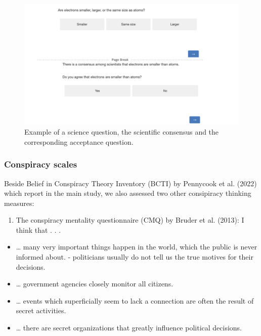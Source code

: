 \documentclass[
  doc,floatsintext]{apa6}
\providecommand{\tightlist}{%
  \setlength{\itemsep}{0pt}\setlength{\parskip}{0pt}}
\begin{document}
\begin{figure}

\includegraphics[width=1\linewidth]{./figures/study1_question_example} \hfill{}

\caption{Example of a science question, the scientific consensus and the corresponding acceptance question.}\label{fig:stimulus-example}
\end{figure}

\subsubsection{Conspiracy scales}\label{conspiracy-scales-1}

Beside Belief in Conspiracy Theory Inventory (BCTI) by Pennycook et al. (2022) which report in the main study, we also assessed two other consipiracy thinking measures:

\begin{enumerate}
\def\labelenumi{\arabic{enumi}.}
\tightlist
\item
  The conspiracy mentality questionnaire (CMQ) by Bruder et al. (2013):
  I think that . . .
\end{enumerate}

\begin{itemize}
\tightlist
\item
  \ldots{} many very important things happen in the world, which the public is never informed about. - politicians usually do not tell us the true motives for their decisions.
\item
  \ldots{} government agencies closely monitor all citizens.
\item
  \ldots{} events which superficially seem to lack a connection are often the result of secret activities.
\item
  \ldots{} there are secret organizations that greatly influence political decisions.
\end{itemize}
\end{document}
